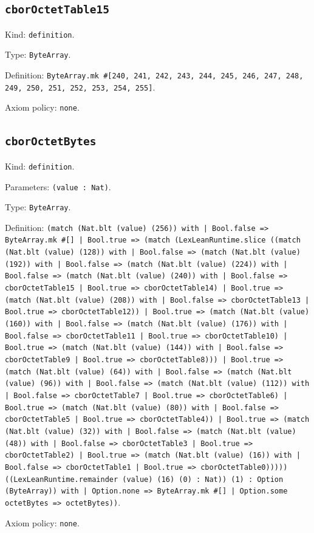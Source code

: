 \documentclass[11pt]{article}
\begin{document}
\subsection*{\texttt{cborOctetTable15}}
\noindent Kind: \texttt{definition}.\par
\noindent Type: \texttt{ByteArray}.\par
\noindent Definition: \texttt{ByteArray.mk \#[240, 241, 242, 243, 244, 245, 246, 247, 248, 249, 250, 251, 252, 253, 254, 255]}.\par
\noindent Axiom policy: \texttt{none}.\par
\subsection*{\texttt{cborOctetBytes}}
\noindent Kind: \texttt{definition}.\par
\noindent Parameters: \texttt{(value : Nat)}.\par
\noindent Type: \texttt{ByteArray}.\par
\noindent Definition: \texttt{(match (Nat.blt (value) (256)) with | Bool.false => ByteArray.mk \#[] | Bool.true => (match (LexLeanRuntime.slice ((match (Nat.blt (value) (128)) with | Bool.false => (match (Nat.blt (value) (192)) with | Bool.false => (match (Nat.blt (value) (224)) with | Bool.false => (match (Nat.blt (value) (240)) with | Bool.false => cborOctetTable15 | Bool.true => cborOctetTable14) | Bool.true => (match (Nat.blt (value) (208)) with | Bool.false => cborOctetTable13 | Bool.true => cborOctetTable12)) | Bool.true => (match (Nat.blt (value) (160)) with | Bool.false => (match (Nat.blt (value) (176)) with | Bool.false => cborOctetTable11 | Bool.true => cborOctetTable10) | Bool.true => (match (Nat.blt (value) (144)) with | Bool.false => cborOctetTable9 | Bool.true => cborOctetTable8))) | Bool.true => (match (Nat.blt (value) (64)) with | Bool.false => (match (Nat.blt (value) (96)) with | Bool.false => (match (Nat.blt (value) (112)) with | Bool.false => cborOctetTable7 | Bool.true => cborOctetTable6) | Bool.true => (match (Nat.blt (value) (80)) with | Bool.false => cborOctetTable5 | Bool.true => cborOctetTable4)) | Bool.true => (match (Nat.blt (value) (32)) with | Bool.false => (match (Nat.blt (value) (48)) with | Bool.false => cborOctetTable3 | Bool.true => cborOctetTable2) | Bool.true => (match (Nat.blt (value) (16)) with | Bool.false => cborOctetTable1 | Bool.true => cborOctetTable0))))) ((LexLeanRuntime.remainder (value) (16) (0) : Nat)) (1) : Option (ByteArray)) with | Option.none => ByteArray.mk \#[] | Option.some octetBytes => octetBytes))}.\par
\noindent Axiom policy: \texttt{none}.\par
\end{document}
